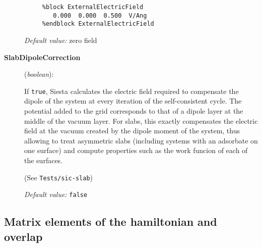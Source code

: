 \documentclass[11pt]{article}
\begin{document}
\begin{description}
\begin{verbatim}
     %block ExternalElectricField
        0.000  0.000  0.500  V/Ang
     %endblock ExternalElectricField
\end{verbatim}

{\it Default value:} zero field

\item[{\bf SlabDipoleCorrection}] ({\it boolean}): 

If {\tt true}, {\sc Siesta} calculates the electric field required to
compensate the dipole of the system at every iteration of the
self-consistent cycle. The potential added to the grid corresponds to
that of a dipole layer at the middle of the vacuum layer. For slabs,
this exactly compensates the electric field at the vacuum created by
the dipole moment of the system, thus allowing to treat asymmetric
slabs (including systems with an adsorbate on one surface) and compute
properties such as the work funcion of each of the surfaces.

(See {\tt Tests/sic-slab})

{\it Default value:} {\tt false}

\end{description}

\subsection{Matrix elements of the hamiltonian and overlap}
\end{document}
